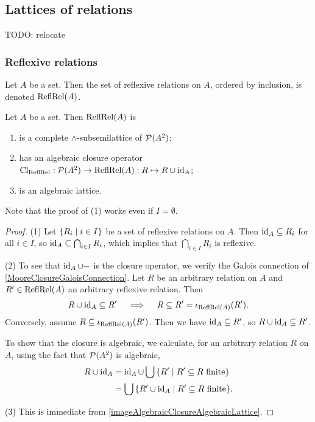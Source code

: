 \subsection{Lattices of relations}
TODO: relocate

\subsubsection{Reflexive relations}
\begin{definition}
Let $A$ be a set. Then the set of reflexive relations on $A$, ordered by inclusion, is denoted $\operatorname{ReflRel}(A)$.
\end{definition}

\begin{proposition}
Let $A$ be a set. Then $\operatorname{ReflRel}(A)$ is
\begin{enumerate}
\item is a complete $\wedge$-subsemilattice of $\operatorname{\mathcal{P}}(A^2)$;
\item has an algebraic closure operator $\operatorname{Cl}_{\operatorname{ReflRel}}: \operatorname{\mathcal{P}}(A^2)\to \operatorname{ReflRel}(A): R\mapsto R\cup \operatorname{id}_A$;
\item is an algebraic lattice.
\end{enumerate}
\end{proposition}
Note that the proof of (1) works even if $I=\emptyset$. 
\begin{proof}
(1) Let $\setbuilder{R_i}{i\in I}$ be a set of reflexive relations on $A$. Then $\operatorname{id}_A \subseteq R_i$ for all $i\in I$, so $\operatorname{id}_A \subseteq \bigcap_{i\in I}R_i$, which implies that $\bigcap_{i\in I}R_i$ is reflexive.

(2) To see that $\operatorname{id}_A \cup -$ is the closure operator, we verify the Galois connection of \ref{MooreClosureGaloisConnection}. Let $R$ be an arbitrary relation on $A$ and $R'\in \operatorname{ReflRel}(A)$ an arbitrary reflexive relation. Then
\[ R\cup \operatorname{id}_A \subseteq R' \quad\implies\quad R\subseteq R' = \operatorname{\iota}_{\operatorname{ReflRel}(A)}(R'). \]
Conversely, assume $R \subseteq \operatorname{\iota}_{\operatorname{ReflRel}(A)}(R')$. Then we have $\operatorname{id}_A \subseteq R'$, so $R\cup\operatorname{id}_A \subseteq R'$.

To show that the closure is algebraic, we calculate, for an arbitrary relation $R$ on $A$, using the fact that $\operatorname{\mathcal{P}}(A^2)$ is algebraic,
\begin{align*}
R\cup \id_A &= \id_A \cup \bigcup\setbuilder{R'}{\text{$R'\subseteq R$ finite}} \\
&= \bigcup\setbuilder{R'\cup\id_A}{\text{$R'\subseteq R$ finite}}.
\end{align*}

(3) This is immediate from \ref{imageAlgebraicClosureAlgebraicLattice}.
\end{proof}

